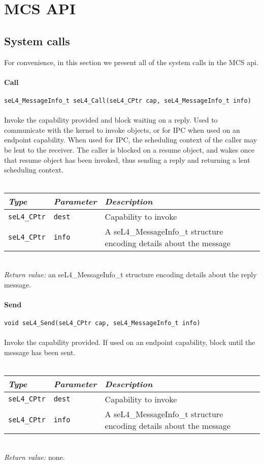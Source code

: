 
\chapter{MCS API}
\label{appendix:api}

\newcommand{\apidoc}[6]
{
    \subsubsection{\label{api:#1}#2}
    \texttt{#4}\\
    \vspace{3pt}\\
    \noindent
    #3\\
    \vspace{3pt}\\
    \begin{tabularx}{\textwidth}{llX}\toprule
        \emph{Type} & \emph{Parameter} & \emph{Description} \\\midrule
         #5
        \bottomrule
    \end{tabularx}
    \vspace{3pt}\\
    \noindent
    \textit{Return value:} #6 
}

\newcommand{\param}[3]
{
\texttt{#1} & \texttt{#2} & #3 \\
}
\section{System calls}

For convenience, in this section we present all of the system calls in the MCS api.

\apidoc{api_call}
{Call}
{Invoke the capability provided and block waiting on a reply. Used to communicate with the kernel 
 to invoke objects, or for \gls{IPC} when used on an endpoint capability. When used for \gls{IPC}, 
  the scheduling context of the caller may be lent to the receiver. The caller is blocked on a
  resume object, and wakes once that resume object has been invoked, thus sending a reply and
  returning a lent scheduling context.}
  {seL4\_MessageInfo\_t seL4\_Call(seL4\_CPtr cap, seL4\_MessageInfo\_t info)}
{
    \param{seL4\_CPtr}{dest}{Capability to invoke}
    \param{seL4\_CPtr}{info}{A seL4\_MessageInfo\_t structure encoding details about the message}
}
{an seL4\_MessageInfo\_t structure encoding details about the reply message.}

\apidoc{api_send}
{Send}
{Invoke the capability provided. If used on an endpoint capability, block until the message has been
sent.}
{void seL4\_Send(seL4\_CPtr cap, seL4\_MessageInfo\_t info)}
{
    \param{seL4\_CPtr}{dest}{Capability to invoke}
    \param{seL4\_CPtr}{info}{A seL4\_MessageInfo\_t structure encoding details about the message}
}
{none.}

